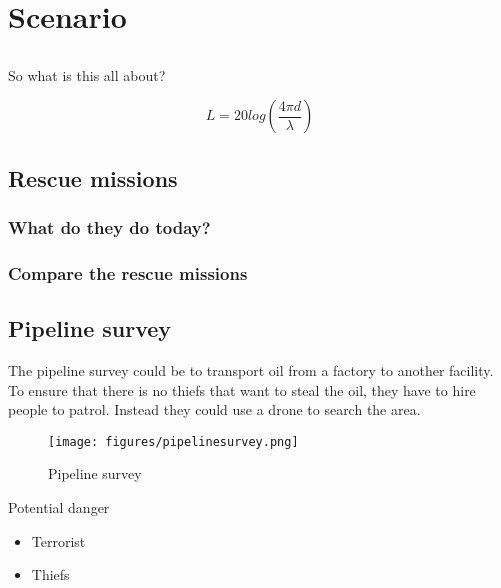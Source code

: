 \chapter{Scenario}\label{ch:scenario}

\section{}

So what is this all about?



\[L = 20log\left (\frac{4\pi d}{\lambda} \right)\]




\section{Rescue missions}
\subsection{What do they do today?}
\subsection{Compare the rescue missions}

\section{Pipeline survey}
The pipeline survey could be to transport oil from a factory to another facility. To ensure that there is no thiefs that want to steal the oil, they have to hire people to patrol. Instead they could use a drone to search the area.
\begin{figure}[hb]
  \centering
  \texttt{[image: figures/pipelinesurvey.png]}
  \caption[Pipeline survey]
   {Pipeline survey}
\end{figure}
Potential danger
\begin{itemize}
\item Terrorist
\item Thiefs
\end{itemize}